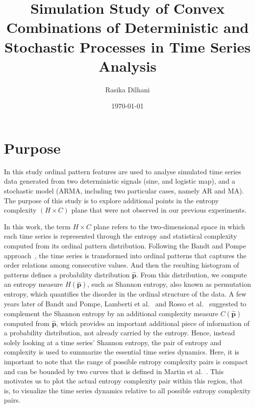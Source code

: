 \documentclass[12pt,a4paper]{article}
\title{Simulation Study of Convex Combinations of Deterministic and Stochastic Processes in Time Series Analysis}
\author{Rasika Dilhani}
\date{\today}
\begin{document}
	
	\maketitle
	
\section{Purpose}
In this study ordinal pattern features are used to analyse simulated time series data generated from two deterministic signals (sine, and logistic map), and a stochastic model (ARMA, including two particular cases, namely AR and MA). 
The purpose of this study is to explore additional points in the entropy complexity $(H \times C)$ plane that were not observed in our previous experiments. 

In this work, the term $H \times C$ plane refers to the two-dimensional space in which each time series is represented through the entropy and statistical complexity computed from its ordinal pattern distribution. 
Following the Bandt and Pompe approach~\cite{PhysRevLett.88.174102}, the time series is transformed into ordinal patterns that captures the order relations among consecutive values. 
And then the resulting histogram of patterns defines a probability distribution $\widehat{\mathbf{p}}$. 
From this distribution, we compute an entropy measure $H(\widehat{\mathbf{p}})$, such as Shannon entropy, also known as permutation entropy, which quantifies the disorder in the ordinal structure of the data. A few years later of Bandt and Pompe, Lamberti et al.~\cite{lamberti2004intensive} and Rosso et al.~\cite{Rosso2007} suggested to complement the Shannon entropy by an additional complexity measure $C(\widehat{\mathbf{p}})$  computed from $\widehat{\mathbf{p}}$, which provides an important additional piece of information of a probability distribution, not already carried by the entropy. Hence, instead solely looking at a time series' Shannon entropy, the pair of entropy and complexity is used to summarize the essential time series dynamics. Here, it is important to note that the range of possible entropy complexity pairs is compact and can be bounded by two curves that is defined in Martin et al.~\cite{Martin2006}. 
This motivates us to plot the actual entropy complexity pair within this region, that is, to visualize the time series dynamics relative to all possible entropy complexity pairs.
\end{document}

